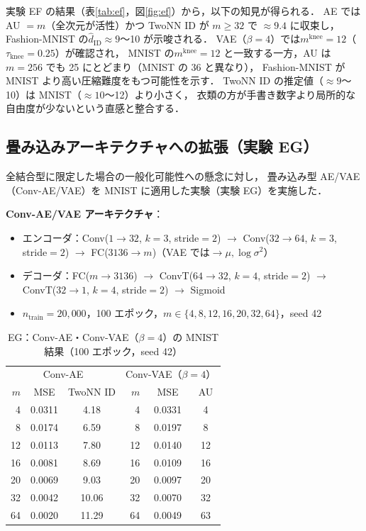 \documentclass[11pt,a4paper]{jsarticle}
\newcommand{\mknee}{m^{\mathrm{knee}}}
\begin{document}
実験 EF の結果（表\ref{tab:ef}，図\ref{fig:ef}）から，以下の知見が得られる．
AE では AU $= m$（全次元が活性）かつ TwoNN ID が $m \geq 32$ で $\approx 9.4$ に収束し，
Fashion-MNIST の$\hat{d}_\mathrm{ID} \approx 9$〜10 が示唆される．
VAE（$\beta=4$）では$\mknee = 12$（$\tau_{\mathrm{knee}} = 0.25$）が確認され，
MNIST の$\mknee = 12$ と一致する一方，AU は$m = 256$ でも 25 にとどまり（MNIST の 36 と異なり），
Fashion-MNIST が MNIST より高い圧縮難度をもつ可能性を示す．
TwoNN ID の推定値（$\approx 9$〜10）は MNIST（$\approx 10$〜12）より小さく，
衣類の方が手書き数字より局所的な自由度が少ないという直感と整合する．

\subsection{畳み込みアーキテクチャへの拡張（実験 EG）}\label{sec:exp_conv}

全結合型に限定した場合の一般化可能性への懸念に対し，
畳み込み型 AE/VAE（Conv-AE/VAE）を MNIST に適用した実験（実験 EG）を実施した．

\textbf{Conv-AE/VAE アーキテクチャ}：
\begin{itemize}
  \item エンコーダ：Conv($1\to32$, $k=3$, stride$=2$) $\to$ Conv($32\to64$, $k=3$, stride$=2$)
        $\to$ FC($3136\to m$)（VAE では$\to \mu, \log\sigma^2$）
  \item デコーダ：FC($m\to3136$) $\to$ ConvT($64\to32$, $k=4$, stride$=2$) $\to$
        ConvT($32\to1$, $k=4$, stride$=2$) $\to$ Sigmoid
  \item $n_{\mathrm{train}} = 20{,}000$，100 エポック，$m \in \{4, 8, 12, 16, 20, 32, 64\}$，seed 42
\end{itemize}

\begin{table}[H]
\centering
\caption{EG：Conv-AE・Conv-VAE（$\beta=4$）の MNIST 結果（100 エポック，seed 42）}
\label{tab:eg}
\small
\begin{tabular}{rcc|rcc}
\toprule
\multicolumn{3}{c|}{Conv-AE} & \multicolumn{3}{c}{Conv-VAE（$\beta=4$）} \\
$m$ & MSE & TwoNN ID & $m$ & MSE & AU \\
\midrule
 4  & 0.0311 & 4.18  &  4  & 0.0331 &  4 \\
 8  & 0.0174 & 6.59  &  8  & 0.0197 &  8 \\
12  & 0.0113 & 7.80  & 12  & 0.0140 & 12 \\
16  & 0.0081 & 8.69  & 16  & 0.0109 & 16 \\
20  & 0.0069 & 9.03  & 20  & 0.0097 & 20 \\
32  & 0.0042 & 10.06 & 32  & 0.0070 & 32 \\
64  & 0.0020 & 11.29 & 64  & 0.0049 & 63 \\
\bottomrule
\end{tabular}
\end{table}
\end{document}
